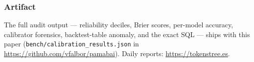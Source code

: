 \documentclass[10pt]{article}
\begin{document}
\subsubsection*{Artifact}
The full audit output --- reliability deciles, Brier scores, per-model accuracy, calibrator forensics, backtest-table anomaly, and the exact SQL --- ships with this paper (\texttt{bench/calibration\_results.json} in \url{https://github.com/vfalbor/pamabai}). Daily reports: \url{https://tokenstree.es}.



\end{document}
